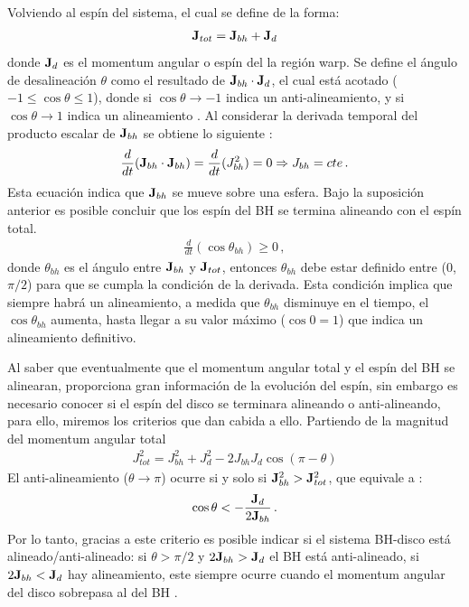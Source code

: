 Volviendo al espín del sistema, el cual se define de la forma:
\begin{align}
	{\bf{J}}_{tot}= {\bf{J}}_{bh}+{\bf{J}}_{d}
\end{align}
donde ${\bf{J}}_{d}$ es el momentum angular o espín del la región warp. Se define el ángulo de desalineación $\theta$ como el resultado de  ${\bf{J}}_{bh}\cdot{\bf{J}}_{d}$, el cual está acotado ($-1\leq \cos\theta \leq 1$), donde si $\cos \theta \to -1$ indica un anti-alineamiento, y si $\cos \theta \to 1$ indica un alineamiento \cite{king2005}. Al considerar la derivada temporal del producto escalar de  ${\bf{J}}_{bh}$ se obtiene lo siguiente \cite{king2005}:
%
\begin{align}
    \frac{d }{dt}({\bf{J}}_{bh}\cdot {\bf{J}}_{bh})=  \frac{d}{dt}(J_{bh}^{2})= 0 \Rightarrow J_{bh}=cte\,.
\end{align}
%
Esta ecuación indica que ${\bf{J}}_{bh}$ se mueve sobre una esfera. Bajo la suposición anterior es posible concluir que los espín del BH se termina alineando con el espín total. 
%
\begin{align}
    \frac{d}{dt}(\cos\theta_{bh})\geq 0\,,
\end{align}
%
donde $\theta_{bh}$ es el ángulo entre ${\bf{J}}_{bh}$ y ${\bf{J}}_{tot}$, entonces $\theta_{bh}$ debe estar definido entre (0,$\pi/2$) para que se cumpla la condición de la derivada. Esta condición implica que siempre habrá un alineamiento, a medida que $\theta_{bh}$ disminuye en el tiempo, el $\cos\theta_{bh}$ aumenta, hasta llegar a su valor máximo ($\cos 0=1$) que indica un alineamiento definitivo.%

Al saber que eventualmente que el momentum angular total y el espín del BH se alinearan, proporciona gran información de la evolución del espín, sin embargo es necesario conocer si el espín del disco se terminara alineando o anti-alineando, para ello, miremos los criterios que dan cabida a ello. Partiendo de la magnitud del momentum angular total
%
\begin{align}
    J^{2}_{tot} = J^{2}_{bh}+J_{d}^{2} -2J_{bh}J_{d}\cos(\pi -\theta)
\end{align}
%
El anti-alineamiento ($\theta\to\pi$) ocurre si y solo si ${\bf{J}}_{bh}^{2}>{\bf{J}}_{tot}^{2}$, que equivale a \cite{king2005}:
%
\begin{align}
    \cos\theta < - \frac{{\bf{J}}_{d}}{2{\bf{J}}_{bh}}\,.   
\end{align}
%
Por lo tanto, gracias a este criterio es posible indicar si el sistema BH-disco está alineado/anti-alineado: si $\theta >\pi/2$ y $2{\bf{J}}_{bh}>{\bf{J}}_{d}$ el BH está anti-alineado, si  $2{\bf{J}}_{bh}<{\bf{J}}_{d}$ hay alineamiento, este siempre ocurre cuando el momentum angular del disco sobrepasa al del BH \cite{king2005}.

